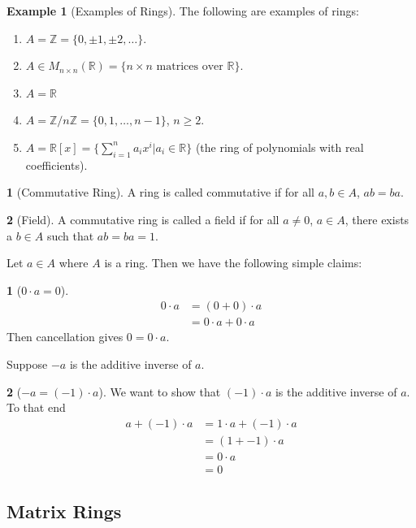\documentclass[12pt]{article}
\theoremstyle{definition}
\newtheorem{definition}{\color{NavyBlue}{\textbf{Definition}}}
\newtheorem{theorem}{\color{ForestGreen}{\textbf{Theorem}}}
\newcommand{\R}{\mathbb{R}}
\newcommand{\Z}{\mathbb{Z}}
\newtheorem{example}{\color{WildStrawberry}Example}
\theoremstyle{definition}
\begin{document}
\begin{example}[Examples of Rings]
The following are examples of rings:
\begin{enumerate}
	\item $A = \Z = \{0, \pm 1, \pm 2, \ldots \}$. 
	\item $A \in M_{n\times n}(\R) = \{n\times n \text{ matrices over } \R \}$.
	\item $A = \R$
	\item $A = \Z / n\Z = \{0,1,\ldots,n-1\}$, $n \geq 2$.
	\item $A = \R[x] = \{\sum_{i=1}^n a_i x^i | a_i \in \R\}$ (the ring of polynomials with real coefficients).
\end{enumerate}
\end{example}

\begin{definition}[Commutative Ring]
	A ring is called commutative if for all $a,b \in A$, $ab = ba$. 
\end{definition}

\begin{definition}[Field]
	A commutative ring is called a field if for all $a \neq 0$, $a \in A$, there exists a $b \in A$ such that $ab = ba = 1$. 
\end{definition}

Let $a \in A$ where $A$ is a ring. Then we have the following simple claims:
\begin{theorem}[$0\cdot a = 0$]
	\begin{align*}
	0 \cdot a &= (0 + 0) \cdot a \tag{$0$ additive identity}\\
	&= 0\cdot a + 0 \cdot a \tag{distributivity} 
	\end{align*}
	Then cancellation gives $0 = 0 \cdot a$. 
\end{theorem}

Suppose $-a$ is the additive inverse of $a$.
\begin{theorem}[$-a = (-1)\cdot a$]
	We want to show that $(-1)\cdot a$ is the additive inverse of $a$. To that end
	\begin{align*}
		a + (-1)\cdot a &= 1 \cdot a + (-1) \cdot a \tag{$1$ multiplicative identity}\\
		&= (1 + -1) \cdot a \tag{distributivity}\\
		&= 0 \cdot a \\
		&= 0
	\end{align*}
\end{theorem}

\subsection{Matrix Rings}
\end{document}

